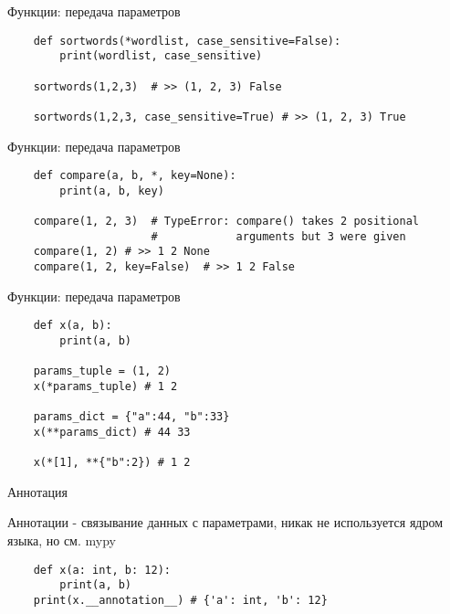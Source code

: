 \documentclass{article}
\begin{document}
\begin{center} Функции: передача параметров \end{center}
\vspace{15pt}
\begin{lstlisting}
    def sortwords(*wordlist, case_sensitive=False):
        print(wordlist, case_sensitive)

    sortwords(1,2,3)  # >> (1, 2, 3) False

    sortwords(1,2,3, case_sensitive=True) # >> (1, 2, 3) True
\end{lstlisting}
\newpage

\begin{center} Функции: передача параметров \end{center}
\vspace{15pt}
\begin{lstlisting}
    def compare(a, b, *, key=None):
        print(a, b, key)

    compare(1, 2, 3)  # TypeError: compare() takes 2 positional
                      #            arguments but 3 were given
    compare(1, 2) # >> 1 2 None
    compare(1, 2, key=False)  # >> 1 2 False
\end{lstlisting}
\newpage

\begin{center} Функции: передача параметров \end{center}
\vspace{15pt}
\begin{lstlisting}
    def x(a, b):
        print(a, b)

    params_tuple = (1, 2)
    x(*params_tuple) # 1 2

    params_dict = {"a":44, "b":33}
    x(**params_dict) # 44 33

    x(*[1], **{"b":2}) # 1 2
\end{lstlisting}
\newpage

\begin{center} Аннотация \end{center}
\vspace{15pt}
Аннотации - связывание данных с параметрами, никак не используется ядром языка,
но см. mypy
\begin{lstlisting}
    def x(a: int, b: 12):
        print(a, b)
    print(x.__annotation__) # {'a': int, 'b': 12}
\end{lstlisting}
\newpage
\end{document}
